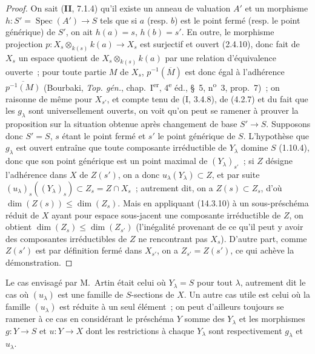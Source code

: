 \begin{proof}
On sait (\textbf{II}, 7.1.4) qu'il existe un anneau de valuation $A'$ et un
morphisme $h:S'=\operatorname{Spec}(A')\to S$ tels que si $a$ (resp. $b$) est le
point fermé (resp. le point générique) de $S'$, on ait $h(a)=s$, $h(b)=s'$. En
outre, le morphisme projection
$p:X_s\otimes_{k(s)}k(a)\to X_s$ est surjectif et ouvert (2.4.10), donc fait de
$X_s$ un espace quotient de $X_s\otimes_{k(s)}k(a)$ par une relation d'équivalence
ouverte~; pour toute partie $M$ de $X_s$, $p^{-1}(\overline M)$ est donc égal à
l'adhérence $\overline{p^{-1}(M)}$ (Bourbaki, \emph{Top. gén.}, chap.~I\textsuperscript{er},
4\textsuperscript{e} éd., \S~5, n\textsuperscript{o}~3, prop.~7)~; on raisonne de
même pour $X_{s'}$, et compte tenu de (I, 3.4.8), de (4.2.7) et du fait que les
$g_\lambda$ sont universellement ouverts, on voit qu'on peut se ramener à prouver
la proposition sur la situation obtenue après changement de base $S'\to S$.
Supposons donc $S'=S$, $s$ étant le point fermé et $s'$ le point générique de $S$.
L'hypothèse que $g_\lambda$ est ouvert entraîne que toute composante irréductible
de $Y_\lambda$ domine $S$ (1.10.4), donc que son point générique est un point
maximal de $(Y_\lambda)_{s'}$~; si $Z$ désigne l'adhérence dans $X$ de $Z(s')$, on
a donc $u_\lambda(Y_\lambda)\subset Z$, et par suite
$(u_\lambda)_s((Y_\lambda)_s)\subset Z_s=Z\cap X_s$~; autrement dit, on a
$Z(s)\subset Z_s$, d'où $\dim(Z(s))\leq\dim(Z_s)$. Mais en appliquant (14.3.10) à
un sous-préschéma réduit de $X$ ayant pour espace sous-jacent une composante
irréductible de $Z$, on obtient $\dim(Z_s)\leq\dim(Z_{s'})$ (l'inégalité provenant
de ce qu'il peut y avoir des composantes irréductibles de $Z$ ne rencontrant pas
$X_s$). D'autre part, comme $Z(s')$ est par définition fermé dans $X_{s'}$, on a
$Z_{s'}=Z(s')$, ce qui achève la démonstration.
\end{proof}

\begin{remark}[14.3.12]
\label{IV.14.3.12-fr}
Le cas envisagé par M.~Artin était celui où $Y_\lambda=S$ pour tout $\lambda$,
autrement dit le cas où $(u_\lambda)$ est une famille de $S$-sections de $X$. Un
autre cas utile est celui où la famille $(u_\lambda)$ est réduite à un seul
élément~; on peut d'ailleurs toujours se ramener à ce cas en considérant le
préschéma $Y$ somme des $Y_\lambda$ et les morphismes $g:Y\to S$ et $u:Y\to X$
dont les restrictions à chaque $Y_\lambda$ sont respectivement $g_\lambda$ et
$u_\lambda$.
\end{remark}

